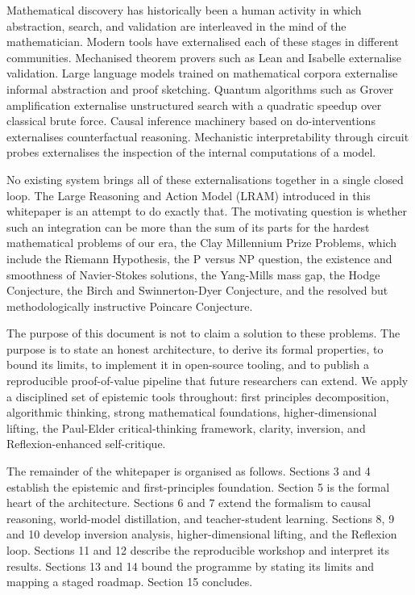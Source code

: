 Mathematical discovery has historically been a human activity in which abstraction, search, and validation are interleaved in the mind of the mathematician. Modern tools have externalised each of these stages in different communities. Mechanised theorem provers such as Lean and Isabelle externalise validation. Large language models trained on mathematical corpora externalise informal abstraction and proof sketching. Quantum algorithms such as Grover amplification externalise unstructured search with a quadratic speedup over classical brute force. Causal inference machinery based on do-interventions externalises counterfactual reasoning. Mechanistic interpretability through circuit probes externalises the inspection of the internal computations of a model.

No existing system brings all of these externalisations together in a single closed loop. The Large Reasoning and Action Model (LRAM) introduced in this whitepaper is an attempt to do exactly that. The motivating question is whether such an integration can be more than the sum of its parts for the hardest mathematical problems of our era, the Clay Millennium Prize Problems, which include the Riemann Hypothesis, the P versus NP question, the existence and smoothness of Navier-Stokes solutions, the Yang-Mills mass gap, the Hodge Conjecture, the Birch and Swinnerton-Dyer Conjecture, and the resolved but methodologically instructive Poincare Conjecture.

The purpose of this document is not to claim a solution to these problems. The purpose is to state an honest architecture, to derive its formal properties, to bound its limits, to implement it in open-source tooling, and to publish a reproducible proof-of-value pipeline that future researchers can extend. We apply a disciplined set of epistemic tools throughout: first principles decomposition, algorithmic thinking, strong mathematical foundations, higher-dimensional lifting, the Paul-Elder critical-thinking framework, clarity, inversion, and Reflexion-enhanced self-critique.

The remainder of the whitepaper is organised as follows. Sections 3 and 4 establish the epistemic and first-principles foundation. Section 5 is the formal heart of the architecture. Sections 6 and 7 extend the formalism to causal reasoning, world-model distillation, and teacher-student learning. Sections 8, 9 and 10 develop inversion analysis, higher-dimensional lifting, and the Reflexion loop. Sections 11 and 12 describe the reproducible workshop and interpret its results. Sections 13 and 14 bound the programme by stating its limits and mapping a staged roadmap. Section 15 concludes.
